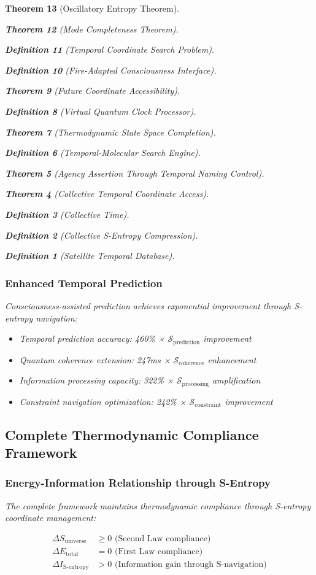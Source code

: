 \documentclass[12pt,a4paper]{article}
\newtheorem{theorem}{Theorem}[section]
\newtheorem{definition}[theorem]{Definition}
\begin{document}
\begin{theorem}[Oscillatory Entropy Theorem]
\begin{theorem}[Mode Completeness Theorem]
\begin{enumerate}
\begin{definition}[Temporal Coordinate Search Problem]
\begin{algorithm}
\begin{definition}[Fire-Adapted Consciousness Interface]
\begin{theorem}[Future Coordinate Accessibility]
\begin{definition}[Virtual Quantum Clock Processor]
\begin{itemize}
\begin{itemize}
\begin{theorem}[Thermodynamic State Space Completion]
\begin{definition}[Temporal-Molecular Search Engine]
\begin{theorem}[Agency Assertion Through Temporal Naming Control]
\begin{remark}
\begin{theorem}[Collective Temporal Coordinate Access]
\begin{definition}[Collective Time]
\begin{definition}[Collective S-Entropy Compression]
\begin{definition}[Satellite Temporal Database]
\begin{algorithm}
\begin{table}[h]
{{\subsubsection{Enhanced Temporal Prediction}

Consciousness-assisted prediction achieves exponential improvement through S-entropy navigation:

\begin{itemize}
\item Temporal prediction accuracy: 460\% × $\mathcal{S}_{\text{prediction}}$ improvement
\item Quantum coherence extension: 247ms × $\mathcal{S}_{\text{coherence}}$ enhancement
\item Information processing capacity: 322\% × $\mathcal{S}_{\text{processing}}$ amplification
\item Constraint navigation optimization: 242\% × $\mathcal{S}_{\text{constraint}}$ improvement
\end{itemize}

\subsection{Complete Thermodynamic Compliance Framework}

\subsubsection{Energy-Information Relationship through S-Entropy}

The complete framework maintains thermodynamic compliance through S-entropy coordinate management:

\begin{align}
\Delta S_{\text{universe}} &\geq 0 \text{ (Second Law compliance)} \\
\Delta E_{\text{total}} &= 0 \text{ (First Law compliance)} \\
\Delta I_{\text{S-entropy}} &> 0 \text{ (Information gain through S-navigation)}
\end{align}

}}
\end{table}
\end{algorithm}
\end{definition}
\end{definition}
\end{definition}
\end{theorem}
\end{remark}
\end{theorem}
\end{definition}
\end{theorem}
\end{itemize}
\end{itemize}
\end{definition}
\end{theorem}
\end{definition}
\end{algorithm}
\end{definition}
\end{enumerate}
\end{theorem}
\end{theorem}
\end{document}
